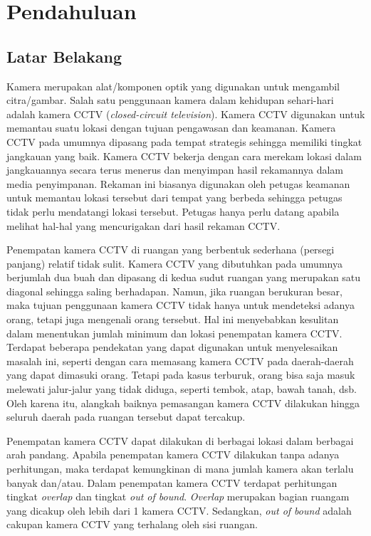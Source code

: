 \chapter{Pendahuluan}
\label{chap:intro}
   
\section{Latar Belakang}
\label{sec:label}

Kamera merupakan alat/komponen optik yang digunakan untuk mengambil citra/gambar. Salah satu penggunaan kamera dalam kehidupan sehari-hari adalah kamera CCTV (\textit{closed-circuit television}). Kamera CCTV digunakan untuk memantau suatu lokasi dengan tujuan pengawasan dan keamanan. Kamera CCTV pada umumnya dipasang pada tempat strategis sehingga memiliki tingkat jangkauan yang baik. Kamera CCTV bekerja dengan cara merekam lokasi dalam jangkauannya secara terus menerus dan menyimpan hasil rekamannya dalam media penyimpanan. Rekaman ini biasanya digunakan oleh petugas keamanan untuk memantau lokasi tersebut dari tempat yang berbeda sehingga petugas tidak perlu mendatangi lokasi tersebut. Petugas hanya perlu datang apabila melihat hal-hal yang mencurigakan dari hasil rekaman CCTV.

Penempatan kamera CCTV di ruangan yang berbentuk sederhana (persegi panjang) relatif tidak sulit. Kamera CCTV yang dibutuhkan pada umumnya berjumlah dua buah dan dipasang di kedua sudut ruangan yang merupakan satu diagonal sehingga saling berhadapan. Namun, jika ruangan berukuran besar, maka tujuan penggunaan kamera CCTV tidak hanya untuk mendeteksi adanya orang, tetapi juga mengenali orang tersebut. Hal ini menyebabkan kesulitan dalam menentukan jumlah minimum dan lokasi penempatan kamera CCTV. Terdapat beberapa pendekatan yang dapat digunakan untuk menyelesaikan masalah ini, seperti dengan cara memasang kamera CCTV pada daerah-daerah yang dapat dimasuki orang. Tetapi pada kasus terburuk, orang bisa saja masuk melewati jalur-jalur yang tidak diduga, seperti tembok, atap, bawah tanah, dsb. Oleh karena itu, alangkah baiknya pemasangan kamera CCTV dilakukan hingga seluruh daerah pada ruangan tersebut dapat tercakup.

Penempatan kamera CCTV dapat dilakukan di berbagai lokasi dalam berbagai arah pandang. Apabila penempatan kamera CCTV dilakukan tanpa adanya perhitungan, maka terdapat kemungkinan di mana jumlah kamera akan terlalu banyak dan/atau. Dalam penempatan kamera CCTV terdapat perhitungan tingkat \textit{overlap} dan tingkat \textit{out of bound}. \textit{Overlap} merupakan bagian ruangam yang dicakup oleh lebih dari 1 kamera CCTV. Sedangkan, \textit{out of bound} adalah cakupan kamera CCTV yang terhalang oleh sisi ruangan.

